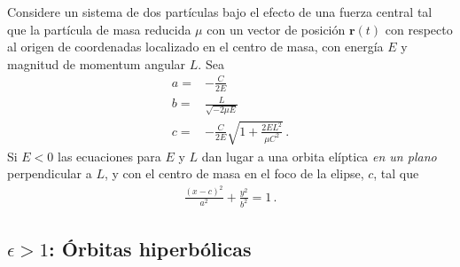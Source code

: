 \begin{frame}
Considere un sistema de dos partículas bajo el efecto de una fuerza central tal que la partícula de masa reducida $\mu$ con un vector de posición $\mathbf{r}(t)$ con respecto al origen de coordenadas localizado en el centro de masa, con energía $E$ y magnitud de momentum angular $L$. Sea
\begin{align}
  a=&-\frac{C}{2E}\nonumber\\
  b=&\frac{L}{\sqrt{-2\mu E}}\nonumber\\
  c=&-\frac{C}{2E}\sqrt{1+\frac{2EL^2}{\mu C^2}}\,.
\end{align}
Si $E<0$ las ecuaciones para $E$ y $L$ dan lugar a una orbita elíptica \emph{en un plano} perpendicular a $L$, y con el centro de masa en el foco de la elipse, $c$, tal que
\begin{align}
  \frac{(x-c)^2}{a^2}+\frac{y^2}{b^2}=1\,.
\end{align}
\end{frame}

\subsection{$\epsilon>1$: Órbitas hiperbólicas}


